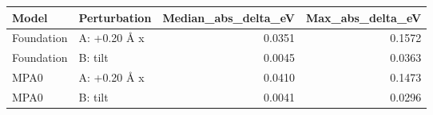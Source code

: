 \begin{tabular}{llrr}
\toprule
Model & Perturbation & Median_abs_delta_eV & Max_abs_delta_eV \\
\midrule
Foundation & A: +0.20 Å x & 0.0351 & 0.1572 \\
Foundation & B: tilt & 0.0045 & 0.0363 \\
MPA0 & A: +0.20 Å x & 0.0410 & 0.1473 \\
MPA0 & B: tilt & 0.0041 & 0.0296 \\
\bottomrule
\end{tabular}
